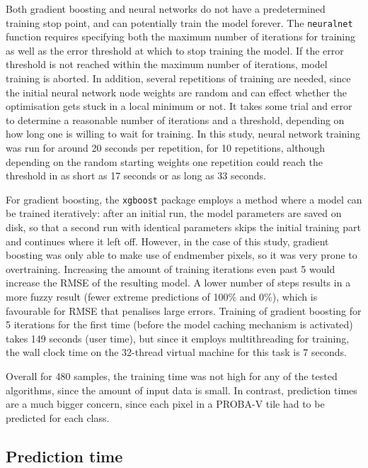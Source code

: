 \documentclass[a4paper,10pt]{book}
\begin{document}
Both gradient boosting and neural networks do not have a predetermined training stop point, and can potentially train the model forever. The \texttt{neuralnet} function requires specifying both the maximum number of iterations for training as well as the error threshold at which to stop training the model. If the error threshold is not reached within the maximum number of iterations, model training is aborted. In addition, several repetitions of training are needed, since the initial neural network node weights are random and can effect whether the optimisation gets stuck in a local minimum or not. It takes some trial and error to determine a reasonable number of iterations and a threshold, depending on how long one is willing to wait for training. In this study, neural network training was run for around 20 seconds per repetition, for 10 repetitions, although depending on the random starting weights one repetition could reach the threshold in as short as 17 seconds or as long as 33 seconds.

For gradient boosting, the \texttt{xgboost} package employs a method where a model can be trained iteratively: after an initial run, the model parameters are saved on disk, so that a second run with identical parameters skips the initial training part and continues where it left off. However, in the case of this study, gradient boosting was only able to make use of endmember pixels, so it was very prone to overtraining. Increasing the amount of training iterations even past 5 would increase the RMSE of the resulting model. A lower number of steps results in a more fuzzy result (fewer extreme predictions of 100\% and 0\%), which is favourable for RMSE that penalises large errors. Training of gradient boosting for 5 iterations for the first time (before the model caching mechanism is activated) takes 149 seconds (user time), but since it employs multithreading for training, the wall clock time on the 32-thread virtual machine for this task is 7 seconds.

Overall for 480 samples, the training time was not high for any of the tested algorithms, since the amount of input data is small. In contrast, prediction times are a much bigger concern, since each pixel in a PROBA-V tile had to be predicted for each class.

\subsection{Prediction time}
\end{document}
